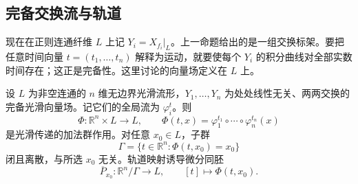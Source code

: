 \subsection{完备交换流与轨道}
\label{g4:subsec:1101:03}

现在在正则连通纤维 \(L\) 上记 \(Y_i=X_{f_i}|_L\)。上一命题给出的是一组交换标架。要把任意时间向量 \(t=(t_1,\ldots,t_n)\) 解释为运动，就要使每个 \(Y_i\) 的积分曲线对全部实数时间存在；这正是完备性。这里讨论的向量场定义在 \(L\) 上。

\begin{proposition}\label{g4:prop:1101:complete-action}
	设 \(L\) 为非空连通的 \(n\) 维无边界光滑流形，\(Y_1,\ldots,Y_n\) 为处处线性无关、两两交换的完备光滑向量场。记它们的全局流为 \(\varphi_i^t\)。则
	\begin{equation}\label{g4:eq:1101:joint-flow}
		\Phi:\mathbb R^n\times L\longrightarrow L,
		\qquad
		\Phi(t,x)=\varphi_1^{t_1}\circ\cdots\circ\varphi_n^{t_n}(x)
	\end{equation}
	是光滑传递的加法群作用。对任意 \(x_0\in L\)，子群
	\begin{equation}\label{g4:eq:1101:period-subgroup}
		\Gamma=\{t\in\mathbb R^n:\Phi(t,x_0)=x_0\}
	\end{equation}
	闭且离散，与所选 \(x_0\) 无关。轨道映射诱导微分同胚
	\begin{equation}\label{g4:eq:1101:homogeneous-fibre}
		\overline P_{x_0}:\mathbb R^n/\Gamma\longrightarrow L,
		\qquad [t]\longmapsto\Phi(t,x_0).
	\end{equation}
\end{proposition}
